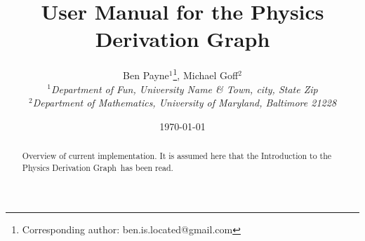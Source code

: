 \documentclass{article}
\newcommand{\pdg}{Physics Derivation Graph}
\begin{document}
\title{User Manual for the \pdg}

\author{Ben Payne$^{1}$\footnote{Corresponding author: ben.is.located@gmail.com}, Michael Goff$^{2}$\\
{\it $^{1}$Department of Fun, University Name \& Town, city, State Zip}\\
{\it $^{2}$Department of Mathematics, University of Maryland, Baltimore 21228}}

\date{\today}


\maketitle %
\begin{abstract}
Overview of current implementation. It is assumed here that the Introduction to the \pdg\ has been read. 
\end{abstract}
\end{document}
